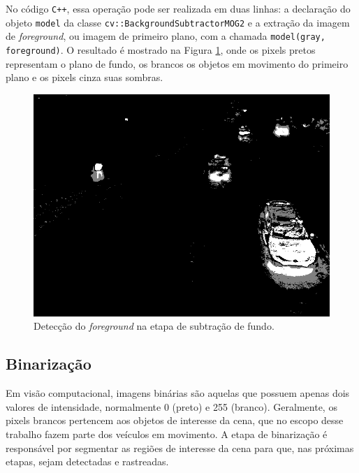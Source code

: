 No código \verb!C++!, essa operação pode ser realizada em duas linhas: a declaração do objeto \verb!model! da classe \verb!cv::BackgroundSubtractorMOG2! e a extração da imagem de \textit{foreground}, ou imagem de primeiro plano, com a chamada \verb!model(gray, foreground)!. O resultado é mostrado na Figura \ref{fig:foreground}, onde os pixels pretos representam o plano de fundo, os brancos os objetos em movimento do primeiro plano e os pixels cinza suas sombras.

\begin{figure}[ht]
  \begin{center}
    \includegraphics[scale=0.5]{imgs/foreground.png}
  \end{center}
  \caption{Detecção do \textit{foreground} na etapa de subtração de fundo.}
  \label{fig:foreground}
\end{figure}


\subsection{Binarização} %
\label{sub:binariza_o}

Em visão computacional, imagens binárias são aquelas que possuem apenas dois valores de intensidade, normalmente 0 (preto) e 255 (branco). Geralmente, os pixels brancos pertencem aos objetos de interesse da cena, que no escopo desse trabalho fazem parte dos veículos em movimento. A etapa de binarização é responsável por segmentar as regiões de interesse da cena para que, nas próximas etapas, sejam detectadas e rastreadas.

